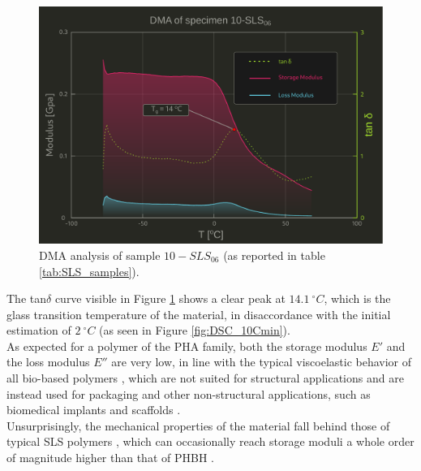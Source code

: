 \documentclass[a4paper]{article}
\begin{document}
            \begin{figure}[H]
                \centering
                \includegraphics[width=\textwidth]{Pictures/Thermal_analysis_plots/DMA.pdf}
                \caption{DMA analysis of sample $10-SLS_{06}$ (as reported in table \ref{tab:SLS_samples}).}
                \label{fig:DMA_plot}
            \end{figure}


        The tan$\delta$ curve visible in Figure \ref{fig:DMA_plot} shows a clear peak at $14.1 \ ^{\circ}C$, which is the glass transition temperature of the material, 
        in disaccordance with the initial estimation of $2 \ ^{\circ}C$ (as seen in Figure \ref{fig:DSC_10Cmin}). \\ 

        As expected for a polymer of the PHA family, both the storage modulus $E'$ and the loss modulus $E''$ are very low, in line with the 
        typical viscoelastic behavior of all bio-based polymers \autocites{Kovalcik_PHA_Review,ZHANG_fatigue_biopolymers}, which are not suited for structural applications and 
        are instead used for packaging \autocites{Biobased_foodpackaging} and other non-structural applications, such as biomedical implants and scaffolds \autocites{Messori_Bondioli_PHAs,PHA_scaffolds_FDM}. \\

        Unsurprisingly, the mechanical properties of the material fall behind those of typical SLS polymers \autocites{Padovano_SLS_Review}, which can 
        occasionally reach storage moduli a whole order of magnitude higher than that of PHBH \autocites{GVSalmoria_PA12_mechanical_properties}. \\ 
\end{document}
